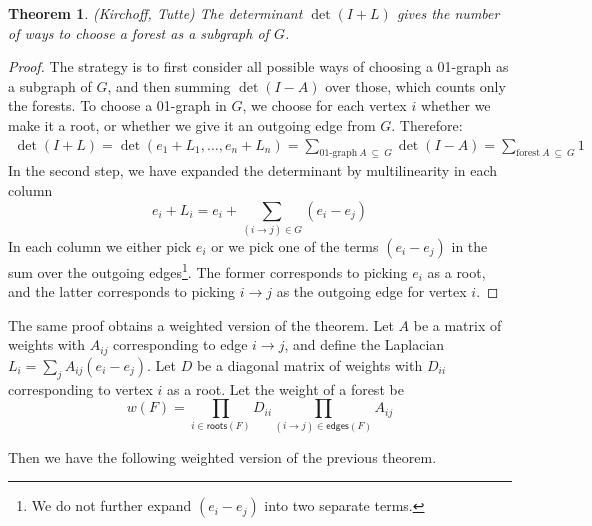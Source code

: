 \documentclass[a4paper, 11pt]{article}
\newtheorem{theorem}{Theorem}[section]
\theoremstyle{definition}
\begin{document}
\begin{theorem}
  (Kirchoff, Tutte) The determinant $\det(I + L)$ gives the number of ways to choose a forest as a subgraph of $G$.
\end{theorem}
\begin{proof}
  The strategy is to first consider all possible ways of choosing a 01-graph as a subgraph of $G$, and then summing $\det(I - A)$ over those, which counts only the forests. To choose a 01-graph in $G$, we choose for each vertex $i$ whether we make it a root, or whether we give it an outgoing edge from $G$. Therefore:
  \begin{align*}
    \det(I + L) = \det(e_1 + L_1, \dots, e_n + L_n)
     = \sum_{\text{01-graph}\ A\ \subseteq\ G} \det(I - A) = \sum_{\text{forest}\ A\ \subseteq\ G} 1
  \end{align*}
  In the second step, we have expanded the determinant by multilinearity in each column
  \[ e_i + L_i = e_i + \sum_{(i \to j) \in G} (e_i - e_j) \]
  In each column we either pick $e_i$ or we pick one of the terms $(e_i - e_j)$ in the sum over the outgoing edges\footnote{We do not further expand $(e_i - e_j)$ into two separate terms.}. The former corresponds to picking $e_i$ as a root, and the latter corresponds to picking $i \to j$ as the outgoing edge for vertex $i$.
\end{proof}

The same proof obtains a weighted version of the theorem. Let $A$ be a matrix of weights with $A_{ij}$ corresponding to edge $i \to j$, and define the Laplacian $L_i = \sum_j A_{ij}(e_i - e_j)$. Let $D$ be a diagonal matrix of weights with $D_{ii}$ corresponding to vertex $i$ as a root. Let the weight of a forest be \[w(F) = \prod_{i \in \mathsf{roots}(F)} D_{ii} \prod_{(i \to j) \in \mathsf{edges}(F)} A_{ij} \]

Then we have the following weighted version of the previous theorem.
\end{document}
